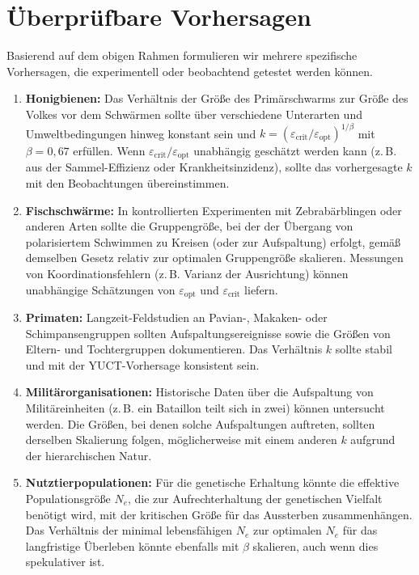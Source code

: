 \documentclass[12pt]{article}
\theoremstyle{remark}
\begin{document}
	\section{Überprüfbare Vorhersagen}
	\label{sec:predictions}
	
	Basierend auf dem obigen Rahmen formulieren wir mehrere spezifische Vorhersagen, die experimentell oder beobachtend getestet werden können.
	
	\begin{enumerate}
		\item \textbf{Honigbienen:} Das Verhältnis der Größe des Primärschwarms zur Größe des Volkes vor dem Schwärmen sollte über verschiedene Unterarten und Umweltbedingungen hinweg konstant sein und $k = (\varepsilon_{\text{crit}}/\varepsilon_{\text{opt}})^{1/\beta}$ mit $\beta = 0,67$ erfüllen. Wenn $\varepsilon_{\text{crit}}/\varepsilon_{\text{opt}}$ unabhängig geschätzt werden kann (z. B. aus der Sammel-Effizienz oder Krankheitsinzidenz), sollte das vorhergesagte $k$ mit den Beobachtungen übereinstimmen.
		
		\item \textbf{Fischschwärme:} In kontrollierten Experimenten mit Zebrabärblingen oder anderen Arten sollte die Gruppengröße, bei der der Übergang von polarisiertem Schwimmen zu Kreisen (oder zur Aufspaltung) erfolgt, gemäß demselben Gesetz relativ zur optimalen Gruppengröße skalieren. Messungen von Koordinationsfehlern (z. B. Varianz der Ausrichtung) können unabhängige Schätzungen von $\varepsilon_{\text{opt}}$ und $\varepsilon_{\text{crit}}$ liefern.
		
		\item \textbf{Primaten:} Langzeit-Feldstudien an Pavian-, Makaken- oder Schimpansengruppen sollten Aufspaltungsereignisse sowie die Größen von Eltern- und Tochtergruppen dokumentieren. Das Verhältnis $k$ sollte stabil und mit der YUCT-Vorhersage konsistent sein.
		
		\item \textbf{Militärorganisationen:} Historische Daten über die Aufspaltung von Militäreinheiten (z. B. ein Bataillon teilt sich in zwei) können untersucht werden. Die Größen, bei denen solche Aufspaltungen auftreten, sollten derselben Skalierung folgen, möglicherweise mit einem anderen $k$ aufgrund der hierarchischen Natur.
		
		\item \textbf{Nutztierpopulationen:} Für die genetische Erhaltung könnte die effektive Populationsgröße $N_e$, die zur Aufrechterhaltung der genetischen Vielfalt benötigt wird, mit der kritischen Größe für das Aussterben zusammenhängen. Das Verhältnis der minimal lebensfähigen $N_e$ zur optimalen $N_e$ für das langfristige Überleben könnte ebenfalls mit $\beta$ skalieren, auch wenn dies spekulativer ist.
		

\end{enumerate}
\end{document}
